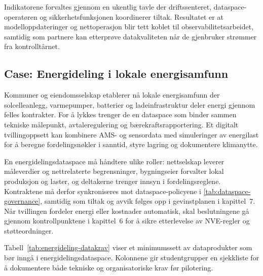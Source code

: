 Indikatorene forvaltes gjennom en ukentlig tavle der driftssenteret, dataspace-operatøren og sikkerhetsfunksjonen koordinerer tiltak. Resultatet er at modelloppdateringer og nettoperasjon blir tett koblet til observabilitetsarbeidet, samtidig som partnere kan etterprøve datakvaliteten når de gjenbruker strømmer fra kontrolltårnet.

\subsection{Case: Energideling i lokale energisamfunn}
Kommuner og eiendomsselskap etablerer nå lokale energisamfunn der solcelleanlegg, varmepumper, batterier og ladeinfrastruktur deler energi gjennom felles kontrakter. For å lykkes trenger de en dataspace som binder sammen tekniske målepunkt, avtaleregulering og bærekraftsrapportering. Et digitalt tvillingoppsett kan kombinere AMS- og sensordata med simuleringer av energilast for å beregne fordelingsnøkler i sanntid, styre lagring og dokumentere klimanytte.

En energidelingsdataspace må håndtere ulike roller: nettselskap leverer måleverdier og nettrelaterte begrensninger, bygningseier forvalter lokal produksjon og laster, og deltakerne trenger innsyn i fordelingsreglene. Kontraktene må derfor synkroniseres mot dataspace-policyene i \autoref{tab:dataspace-governance}, samtidig som tiltak og avvik følges opp i gevinstplanen i kapittel~7. Når tvillingen fordeler energi eller kostnader automatisk, skal beslutningene gå gjennom kontrollpunktene i kapittel~6 for å sikre etterlevelse av NVE-regler og støtteordninger.

Tabell~\ref{tab:energideling-datakrav} viser et minimumssett av dataprodukter som bør inngå i energidelingsdataspace. Kolonnene gir studentgrupper en sjekkliste for å dokumentere både tekniske og organisatoriske krav før pilotering.

